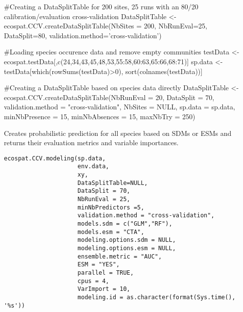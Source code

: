\documentclass[a4paper]{book}
\begin{document}
%
\begin{Examples}
\begin{ExampleCode}
#Creating a DataSplitTable for 200 sites, 25 runs with an 80/20 calibration/evaluation cross-validation
DataSplitTable <- ecospat.CCV.createDataSplitTable(NbSites = 200, 
                                                   NbRunEval=25, 
                                                   DataSplit=80, 
                                                   validation.method='cross-validation')
                                                   
#Loading species occurence data and remove empty communities
testData <- ecospat.testData[,c(24,34,43,45,48,53,55:58,60:63,65:66,68:71)]
sp.data <- testData[which(rowSums(testData)>0), sort(colnames(testData))]

#Creating a DataSplitTable based on species data directly
DataSplitTable <- ecospat.CCV.createDataSplitTable(NbRunEval = 20,
                                                   DataSplit = 70,
                                                   validation.method = "cross-validation",
                                                   NbSites = NULL,
                                                   sp.data = sp.data, 
                                                   minNbPresence = 15, 
                                                   minNbAbsences = 15, 
                                                   maxNbTry = 250)
\end{ExampleCode}
\end{Examples}
%
\begin{Description}\relax
Creates probabilistic prediction for all species based on SDMs or ESMs and returns their evaluation metrics and variable importances.

\end{Description}
%
\begin{Usage}
\begin{verbatim}
ecospat.CCV.modeling(sp.data, 
                     env.data, 
                     xy,
                     DataSplitTable=NULL,
                     DataSplit = 70, 
                     NbRunEval = 25,
                     minNbPredictors =5,
                     validation.method = "cross-validation",
                     models.sdm = c("GLM","RF"), 
                     models.esm = "CTA", 
                     modeling.options.sdm = NULL, 
                     modeling.options.esm = NULL, 
                     ensemble.metric = "AUC", 
                     ESM = "YES",
                     parallel = TRUE, 
                     cpus = 4,
                     VarImport = 10,
                     modeling.id = as.character(format(Sys.time(), '%s'))
\end{verbatim}
\end{Usage}
\end{document}
